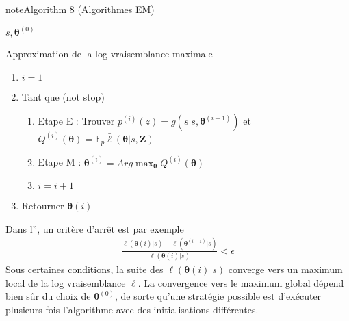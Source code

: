 \documentclass[letterpaper,10pt,french]{sphinxmanual}
\begin{document}
\begin{sphinxadmonition}{note}{Algorithm 8 (Algorithmes EM)}



\sphinxAtStartPar
{} \(s,\boldsymbol\theta^{(0)}\)

\sphinxAtStartPar
{} Approximation de la log vraisemblance maximale
\begin{enumerate}
%
\item {} 
\sphinxAtStartPar
\(i=1\)

\item {} 
\sphinxAtStartPar
Tant que (not stop)
\begin{enumerate}
%
\item {} 
\sphinxAtStartPar
Etape E : Trouver \(p^{(i)}(z) = g(s|s,\boldsymbol\theta^{(i-1)})\) et \(Q^{(i)}(\boldsymbol\theta)=\mathbb{E}_p \bar\ell(\boldsymbol \theta |s,\mathbf Z)\)

\item {} 
\sphinxAtStartPar
Etape M : \(\boldsymbol\theta^{(i)} = Arg \displaystyle\max_{\boldsymbol\theta} Q^{(i)}(\boldsymbol\theta)\)

\item {} 
\sphinxAtStartPar
\(i = i+1\)

\end{enumerate}

\item {} 
\sphinxAtStartPar
Retourner \(\boldsymbol\theta{(i)}\)

\end{enumerate}
\end{sphinxadmonition}

\sphinxAtStartPar
Dans l”{\hyperref[\detokenize{clustering:EM}]{}}, un critère d’arrêt est par exemple
\begin{equation*}
\begin{split}\frac{\ell(\boldsymbol\theta{(i)}|s)-\ell(\boldsymbol\theta^{(i-1)}|s)}{\ell(\boldsymbol\theta{(i)}|s)}<\epsilon\end{split}
\end{equation*}
\sphinxAtStartPar
Sous certaines conditions, la suite des \(\ell(\boldsymbol\theta{(i)}|s)\) converge vers un maximum local de la log vraisemblance \(\ell\). La convergence vers le maximum global dépend bien sûr du choix de \(\boldsymbol\theta^{(0)}\), de sorte qu’une stratégie possible est d’exécuter plusieurs fois l’algorithme avec des initialisations différentes.
\end{document}
